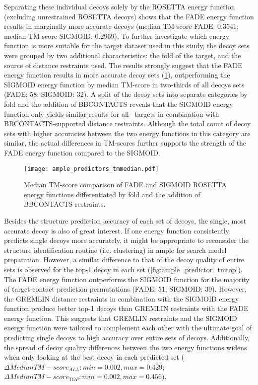 Separating these individual decoys solely by the ROSETTA energy function (excluding unrestrained ROSETTA decoys) shows that the FADE energy function results in marginally more accurate decoys (median TM-score FADE: 0.3541; median TM-score SIGMOID: 0.2969). To further investigate which energy function is more suitable for the target dataset used in this study, the decoy sets were grouped by two additional characteristics: the fold of the target, and the source of distance restraints used. The results strongly suggest that the FADE energy function results in more accurate decoy sets (\cref{fig:ample_predictor_tmmedian}), outperforming the SIGMOID energy function by median TM-score in two-thirds of all decoys sets (FADE: 58; SIGMOID: 32). A split of the decoy sets into separate categories by fold and the addition of BBCONTACTS reveals that the SIGMOID energy function only yields similar results for all-\textbeta\ targets in combination with BBCONTACTS-supported distance restraints. Although the total count of decoy sets with higher accuracies between the two energy functions in this category are similar, the actual differences in TM-scores further supports the strength of the FADE energy function compared to the SIGMOID.

\begin{figure}[H]
    \centering
    \texttt{[image: ample\_predictors\_tmmedian.pdf]}
    \caption{Median TM-score comparison of FADE and SIGMOID ROSETTA energy functions differentiated by fold and the addition of BBCONTACTS restraints.}
    \label{fig:ample_predictor_tmmedian}
\end{figure}

Besides the structure prediction accuracy of each set of decoys, the single, most accurate decoy is also of great interest. If one energy function consistently predicts single decoys more accurately, it might be appropriate to reconsider the structure identification routine (i.e. clustering) in \gls{ample} for search model preparation. However, a similar difference to that of the decoy quality of entire sets is observed for the top-1 decoy in each set (\cref{fig:ample_predictor_tmtop}). The FADE energy function outperforms the SIGMOID function for the majority of target-contact prediction permutations (FADE: 51; SIGMOID: 39). However, the GREMLIN distance restraints in combination with the SIGMOID energy function produce better top-1 decoys than GREMLIN restraints with the FADE energy function. This suggests that GREMLIN restraints and the SIGMOID energy function were tailored to complement each other with the ultimate goal of predicting single decoys to high accuracy over entire sets of decoys. Additionally, the spread of decoy quality differences between the two energy functions widens when only looking at the best decoy in each predicted set ($\Delta Median TM-score_{ALL}: min=0.002, max=0.429$; $\Delta Median TM-score_{TOP}: min=0.002, max=0.456$). 

